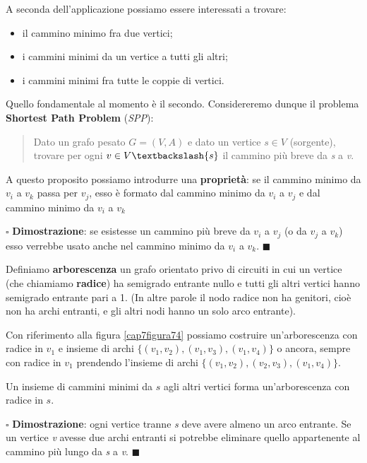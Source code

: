 \documentclass[11pt]{book}
\begin{document}
A seconda dell'applicazione possiamo essere interessati a trovare:


\begin{itemize}
\item il cammino minimo fra due vertici;
\item i cammini minimi da un vertice a tutti gli altri;
\item i cammini minimi fra tutte le coppie di vertici.
\end{itemize}


Quello fondamentale al momento \`e il secondo. Considereremo dunque il
problema {\bf Shortest Path Problem} ({\em SPP}):


\begin{quote}
Dato un grafo pesato $G=(V,A)$ e dato un vertice $s \in V$ (sorgente),
trovare per ogni $v \in V \textbackslash \{s\}$ il cammino pi\`u breve
da {\em s} a {\em v}.
\end{quote}


A questo proposito possiamo introdurre una {\bf propriet\`a}: se il
cammino minimo da $v_i$ a $v_k$ passa per $v_j$, esso \`e formato dal
cammino minimo da $v_i$ a $v_j$ e dal cammino minimo da $v_i$ a $v_k$


\vspace{11pt}
$\square$ {\bf Dimostrazione}: se esistesse un cammino pi\`u breve da
$v_i$ a $v_j$ (o da $v_j$ a $v_k$) esso verrebbe usato anche nel
cammino minimo da $v_i$ a $v_k$. $\blacksquare$
\vspace{11pt}


Definiamo {\bf arborescenza} un grafo orientato privo di circuiti in
cui un vertice (che chiamiamo {\bf radice}) ha semigrado entrante
nullo e tutti gli altri vertici hanno semigrado entrante pari a 1. (In
altre parole il nodo radice non ha genitori, cio\`e non ha archi
entranti, e gli altri nodi hanno un solo arco entrante).


Con riferimento alla figura \ref{cap7figura74} possiamo costruire
un'arborescenza con radice in $v_1$ e insieme di archi $\{(v_1, v_2),
(v_1, v_3), (v_1, v_4)\}$ o ancora, sempre con radice in $v_1$
prendendo l'insieme di archi $\{(v_1, v_2), (v_2, v_3), (v_1, v_4)\}$.


Un insieme di cammini minimi da $s$ agli altri vertici forma
un'arborescenza con radice in $s$.

\vspace{11pt}
$\square$ {\bf Dimostrazione}: ogni vertice tranne {\em s} deve avere
almeno un arco entrante. Se un vertice {\em v} avesse due archi
entranti si potrebbe eliminare quello appartenente al cammino pi\`u
lungo da {\em s} a {\em v}.
$\blacksquare$
\vspace{11pt}
\end{document}
